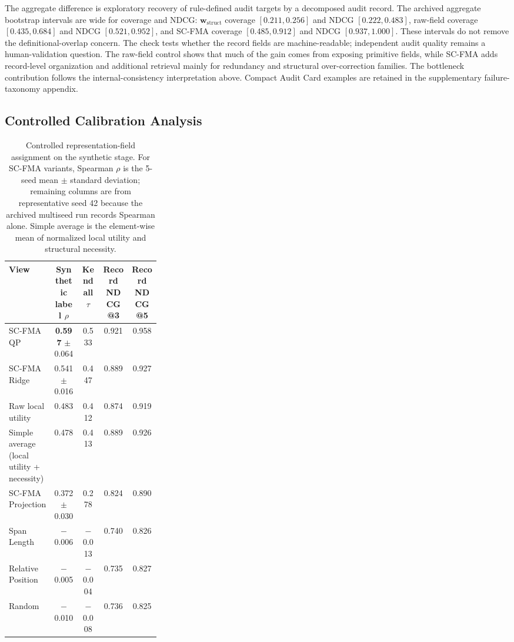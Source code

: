 \documentclass[pdflatex,sn-mathphys-num,iicol]{sn-jnl}
\newcommand{\wstruct}{\ensuremath{\mathbf{w}_{\mathrm{struct}}}}
\begin{document}
The aggregate difference is exploratory recovery of rule-defined audit targets by a decomposed audit record. The archived aggregate bootstrap intervals are wide for coverage and NDCG: \wstruct{} coverage $[0.211,0.256]$ and NDCG $[0.222,0.483]$, raw-field coverage $[0.435,0.684]$ and NDCG $[0.521,0.952]$, and SC-FMA coverage $[0.485,0.912]$ and NDCG $[0.937,1.000]$. These intervals do not remove the definitional-overlap concern. The check tests whether the record fields are machine-readable; independent audit quality remains a human-validation question. The raw-field control shows that much of the gain comes from exposing primitive fields, while SC-FMA adds record-level organization and additional retrieval mainly for redundancy and structural over-correction families. The bottleneck contribution follows the internal-consistency interpretation above. Compact Audit Card examples are retained in the supplementary failure-taxonomy appendix.


\subsection{Controlled Calibration Analysis}
\label{sec:controlled-calibration}

\begin{table}[ht]
\caption{Controlled representation-field assignment on the synthetic stage. For SC-FMA variants, Spearman $\rho$ is the 5-seed mean $\pm$ standard deviation; remaining columns are from representative seed 42 because the archived multiseed run records Spearman alone. Simple average is the element-wise mean of normalized local utility and structural necessity.}
\label{tab:controlled-calibration-results}
\centering
\small
\begin{tabular}{Z{0.30\linewidth}cccc}
\toprule
\textbf{View} & \textbf{Synthetic label $\rho$} & \textbf{Kendall $\tau$} & \textbf{Record NDCG@3} & \textbf{Record NDCG@5} \\
\midrule
SC-FMA QP                  & \textbf{0.597} $\pm$ 0.064 & 0.533 & 0.921 & 0.958 \\
SC-FMA Ridge               & 0.541 $\pm$ 0.016 & 0.447 & 0.889 & 0.927 \\
Raw local utility          & 0.483 & 0.412 & 0.874 & 0.919 \\
Simple average (local utility + necessity) & 0.478 & 0.413 & 0.889 & 0.926 \\
SC-FMA Projection          & 0.372 $\pm$ 0.030 & 0.278 & 0.824 & 0.890 \\
Span Length                & $-$0.006 & $-$0.013 & 0.740 & 0.826 \\
Relative Position          & $-$0.005 & $-$0.004 & 0.735 & 0.827 \\
Random                     & $-$0.010 & $-$0.008 & 0.736 & 0.825 \\
\bottomrule
\end{tabular}
\end{table}
\end{document}

